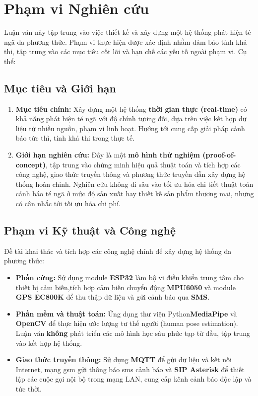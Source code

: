 
\section{Phạm vi Nghiên cứu}

Luận văn này tập trung vào việc thiết kế và xây dựng một hệ thống phát hiện té ngã đa phương thức. Phạm vi thực hiện được xác định nhằm đảm bảo tính khả thi, tập trung vào các mục tiêu cốt lõi và hạn chế các yếu tố ngoài phạm vi. Cụ thể:

\subsection{Mục tiêu và Giới hạn}
\begin{enumerate}
    \item \textbf{Mục tiêu chính:} Xây dựng một hệ thống \textbf{thời gian thực (real-time)} có khả năng phát hiện té ngã với độ chính tương đối, dựa trên việc kết hợp dữ liệu từ nhiều nguồn, phạm vi linh hoạt. Hướng tới cung cấp giải pháp cảnh báo tức thì, tính khả thi trong thực tế.
    
    \item \textbf{Giới hạn nghiên cứu:} Đây là một \textbf{mô hình thử nghiệm (proof-of-concept)}, tập trung vào chứng minh hiệu quả thuật toán và tích hợp các công nghệ, giao thức truyền thông và phương thức truyền dẫn xây dựng hệ thống hoàn chỉnh. Nghiên cứu không đi sâu vào tối ưu hóa chi tiết thuật toán cảnh báo té ngã ở mức độ sản xuất hay thiết kế sản phẩm thương mại, nhưng có cân nhắc tới tối ưu hóa chi phí.
\end{enumerate}

\subsection{Phạm vi Kỹ thuật và Công nghệ}
Đề tài khai thác và tích hợp các công nghệ chính để xây dựng hệ thống đa phương thức:
\begin{itemize}
    \item \textbf{Phần cứng:} Sử dụng module \textbf{ESP32} làm bộ vi điều khiển trung tâm cho thiết bị cảm biến,tích hợp cảm biến chuyển động \textbf{MPU6050} và module \textbf{GPS EC800K} để thu thập dữ liệu và gửi cảnh báo qua \textbf{SMS}.
    
    \item \textbf{Phần mềm và thuật toán:} Ứng dụng thư viện  Python\textbf{MediaPipe} và \textbf{OpenCV} để thực hiện ước lượng tư thế người (human pose estimation). Luận văn \textbf{không} phát triển các mô hình học sâu phức tạp từ đầu, tập trung vào kết hợp hệ thống.
    
    \item \textbf{Giao thức truyền thông:} Sử dụng \textbf{MQTT} để gửi dữ liệu và kết nối Internet, mạng gsm gửi thông báo sms cảnh báo và \textbf{SIP Asterisk} để thiết lập các cuộc gọi nội bộ trong mạng LAN, cung cấp kênh cảnh báo độc lập và tức thời.
\end{itemize}

